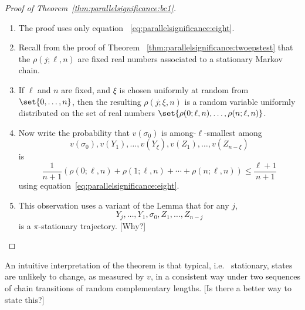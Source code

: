 \documentclass[12pt]{article}
\begin{document}
\begin{proof}[Proof of Theorem~\ref{thm:parallelsignificance:bc1}]
    \begin{enumerate}
        \item
            The proof uses only equation~%
            \eqref{eq:parallelsignificance:eight}.
        \item
            Recall from the proof of Theorem~%
            \ref{thm:parallelsignificance:twoepstest} that the \( \rho(j;
            \ell, n) \) are fixed real numbers associated to a
            stationary Markov chain.
        \item
            If \( \ell \) and \( n \) are fixed, and \( \xi \) is chosen
            uniformly at random from \( \set{0, \dots, n} \), then the
            resulting \( \rho(j; \xi, n) \) is a random variable
            uniformly distributed on the set of real numbers \( \set{\rho
            (0; \ell, n), \dots, \rho(n; \ell, n)} \).
        \item
            Now write the probability that \( v(\sigma_0) \) is among-\(
            \ell \)-smallest among
            \[ v(\sigma_0), v(Y_1), \dots, v(Y_{\xi}),
              v(Z_1), \dots, v(Z_ {n-\xi})
            \] is
            \[
                \frac{1}{n+1} (\rho(0; \ell, n)+ \rho(1; \ell, n) +
                \cdots + \rho(n; \ell, n) ) \le \frac{\ell + 1}{n + 1}
            \] using equation~\eqref{eq:parallelsignificance:eight}.
        \item
            This observation uses a variant of the Lemma that for any \(
            j \),
            \[
              Y_j, \dots, Y_1, \sigma_0, Z_1, \dots, Z_{n-j}
            \]
            is a \( \pi \)-stationary trajectory. [Why?]
    \end{enumerate}
\end{proof}

\begin{remark}
    An intuitive interpretation of the theorem is that typical, i.e.\ %
    stationary, states are unlikely to change, as measured by \( v \),
    in a consistent way under two sequences of chain transitions of
    random complementary lengths. [Is there a better way to state this?]
\end{remark}
\end{document}
